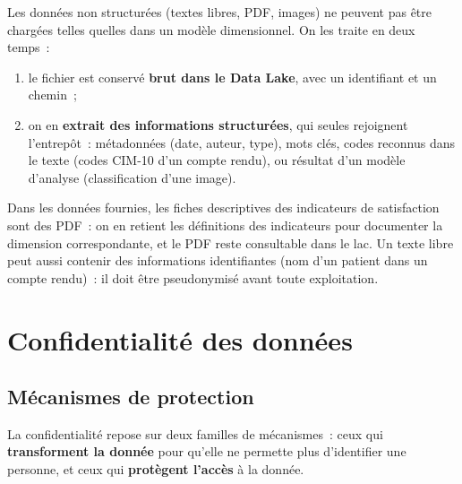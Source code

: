 \noindent Les données non structurées (textes libres, PDF, images) ne peuvent pas être chargées telles quelles dans un modèle dimensionnel. On les traite en deux temps~:
\begin{enumerate}
	\item le fichier est conservé \textbf{brut dans le Data Lake}, avec un identifiant et un chemin~;
	\item on en \textbf{extrait des informations structurées}, qui seules rejoignent l'entrepôt~: métadonnées (date, auteur, type), mots clés, codes reconnus dans le texte (codes CIM-10 d'un compte rendu), ou résultat d'un modèle d'analyse (classification d'une image).
\end{enumerate}
\noindent Dans les données fournies, les fiches descriptives des indicateurs de satisfaction sont des PDF~: on en retient les définitions des indicateurs pour documenter la dimension correspondante, et le PDF reste consultable dans le lac. Un texte libre peut aussi contenir des informations identifiantes (nom d'un patient dans un compte rendu)~: il doit être pseudonymisé avant toute exploitation.

\newpage
\section{Confidentialité des données}

\subsection{Mécanismes de protection}

\noindent La confidentialité repose sur deux familles de mécanismes~: ceux qui \textbf{transforment la donnée} pour qu'elle ne permette plus d'identifier une personne, et ceux qui \textbf{protègent l'accès} à la donnée.

